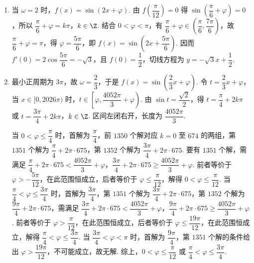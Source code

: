 \documentclass[UTF8,a4paper,oneside,11pt]{ctexbook}
\begin{document}
\begin{solution}
\begin{enumerate}
\item 当 \(\omega=2\) 时，\(f(x)=\sin(2x+\varphi)\). 由 \(f\left(\dfrac{\pi}{12}\right)=0\) 得 \(\sin\left(\dfrac{\pi}{6}+\varphi\right)=0\)，所以 \(\dfrac{\pi}{6}+\varphi=k\pi\)，\(k\in\Z\). 结合 \(0<\varphi<\pi\)，有 \(\dfrac{\pi}{6}+\varphi\in\left(\dfrac{\pi}{6},\dfrac{7\pi}{6}\right)\)，故 \(\dfrac{\pi}{6}+\varphi=\pi\)，得 \(\varphi=\dfrac{5\pi}{6}\)，即 \(f(x)=\sin\left(2x+\dfrac{5\pi}{6}\right)\). 因而 \(f'(0)=2\cos\dfrac{5\pi}{6}=-\sqrt3\)，且 \(f(0)=\dfrac12\)，切线方程为 \(y=-\sqrt3x+\dfrac12\).

\item 最小正周期为 \(3\pi\)，故 \(\omega=\dfrac23\)，于是 \(f(x)=\sin\left(\dfrac23x+\varphi\right)\). 令 \(t=\dfrac23x+\varphi\)，当 \(x\in[0,2026\pi)\) 时，\(t\in\left[\varphi,\dfrac{4052\pi}{3}+\varphi\right)\). 由 \(\sin t=\dfrac{\sqrt2}{2}\)，得 \(t=\dfrac{\pi}{4}+2k\pi\) 或 \(t=\dfrac{3\pi}{4}+2k\pi\)，\(k\in\Z\). 区间左闭右开，长度为 \(\dfrac{4052\pi}{3}\).

当 \(0<\varphi\le\dfrac{\pi}{4}\) 时，首解为 \(\dfrac{\pi}{4}\)，前 \(1350\) 个解对应 \(k=0\) 至 \(674\) 的两组，第 \(1351\) 个解为 \(\dfrac{\pi}{4}+2\pi\cdot675\)，第 \(1352\) 个解为 \(\dfrac{3\pi}{4}+2\pi\cdot675\). 要有 \(1351\) 个解，需满足 \(\dfrac{\pi}{4}+2\pi\cdot675<\dfrac{4052\pi}{3}+\varphi\)，\(\dfrac{3\pi}{4}+2\pi\cdot675\ge\dfrac{4052\pi}{3}+\varphi\). 前者等价于 \(\varphi>-\dfrac{5\pi}{12}\)，在此范围恒成立，后者等价于 \(\varphi\le\dfrac{\pi}{12}\)，解得 \(0<\varphi\le\dfrac{\pi}{12}\). 当 \(\dfrac{\pi}{4}<\varphi\le\dfrac{3\pi}{4}\) 时，首解为 \(\dfrac{3\pi}{4}\)，第 \(1351\) 个解为 \(\dfrac{3\pi}{4}+2\pi\cdot675\)，第 \(1352\) 个解为 \(\dfrac{9\pi}{4}+2\pi\cdot675\)，需满足 \(\dfrac{3\pi}{4}+2\pi\cdot675<\dfrac{4052\pi}{3}+\varphi\)，\(\dfrac{9\pi}{4}+2\pi\cdot675\ge\dfrac{4052\pi}{3}+\varphi\). 前者等价于 \(\varphi>\dfrac{\pi}{12}\)，在此范围恒成立，后者等价于 \(\varphi\le\dfrac{19\pi}{12}\)，在此范围恒成立，解得 \(\dfrac{\pi}{4}<\varphi\le\dfrac{3\pi}{4}\). 当 \(\dfrac{3\pi}{4}<\varphi<\pi\) 时，首解为 \(\dfrac{9\pi}{4}\)，第 \(1351\) 个解的条件给出 \(\varphi>\dfrac{19\pi}{12}\)，不可能成立，故无解. 综上，\(0<\varphi\le\dfrac{\pi}{12}\) 或 \(\dfrac{\pi}{4}<\varphi\le\dfrac{3\pi}{4}\).
\end{enumerate}
\end{solution}
\end{document}
